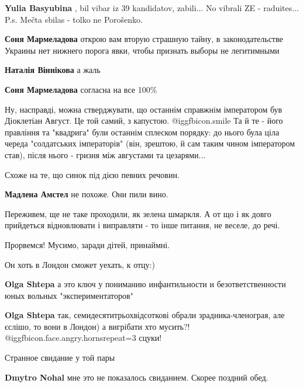 \begin{itemize}
\begin{itemize}
\textbf{Yulia Basyubina} , bil vibar iz 39 kandidatov, zabili... No vibrali ZE - raduites... P.s. Mečta sbilas - tolko ne Porošenko.

\textbf{Соня Мармеладова} открою вам вторую страшную тайну, в законодательстве Украины нет нижнего порога явки, чтобы признать выборы не легитимными

\textbf{Наталія Віннікова} а жаль

\textbf{Соня Мармеладова} согласна на все 100\%
\end{itemize} %


Ну, насправді, можна стверджувати, що останнім справжнім імператором був
Діоклетіан Август. Це той самий, з капустою.  @igg{fbicon.smile}  Та й те - його правління та
"квадрига" були останнім сплеском порядку: до нього була ціла череда
"солдатських імператорів" (він, зрештою, й сам таким чином імператором став),
після нього - гризня між августами та цезарями...


Схоже на те, що синок під дією певних речовин.

\begin{itemize} %
\textbf{Мадлена Амстел} не похоже. Они пили вино.
\end{itemize} %


Переживем, ще не таке проходили, як зелена шмаркля. А от що і як довго
прийдеться відновлювати і виправляти - то інше питання, не веселе, до речі.

Прорвемся! Мусимо, заради дітей, принаймні.

Он хоть в Лондон сможет уехать, к отцу:)

\begin{itemize} %
\textbf{Olga Shtepa} а это ключ у пониманию инфантильности и безответственности юных вольных "экспериментаторов"

\textbf{Olga Shtepa} так, семидесятитрьохвідсоткові обрали зрадника-членограя, але єслішо, то вони в Лондон) а вигрібати хто мусить?!
 @igg{fbicon.face.angry.horns}{repeat=3}  сцуки!
\end{itemize} %

Странное свидание у той пары

\begin{itemize} %
\textbf{Dmytro Nohal} мне это не показалось свиданием. Скорее поздний обед.


\end{itemize}
\end{itemize}
